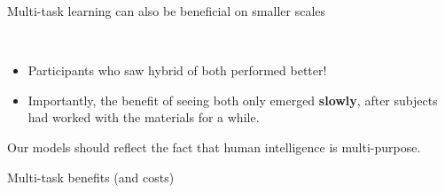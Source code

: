 \documentclass{beamer}
\begin{document}
\begin{frame}{Multi-task learning can also be beneficial on smaller scales}
\begin{figure}
\centering
\begin{subfigure}{0.3\textwidth}
\end{subfigure}~
\begin{subfigure}{0.65\textwidth}
\end{subfigure}
\end{figure}
\vspace{1.5em}
\begin{itemize}
\item<4-> Participants who saw hybrid of both performed better!
\item<5-> Importantly, the benefit of seeing both only emerged \textbf{slowly}, after subjects had worked with the materials for a while.
\end{itemize}
\vspace{1.5em}
{
\scriptsize
\citep{Lampinen2017b}
}
\end{frame}

\begin{frame}[standout]
Our models should reflect the fact that human intelligence is multi-purpose.\par
\end{frame}

\begin{frame}{Multi-task benefits (and costs)}
\begin{figure}
\centering
{}
\end{figure}
\end{frame}
\end{document}
